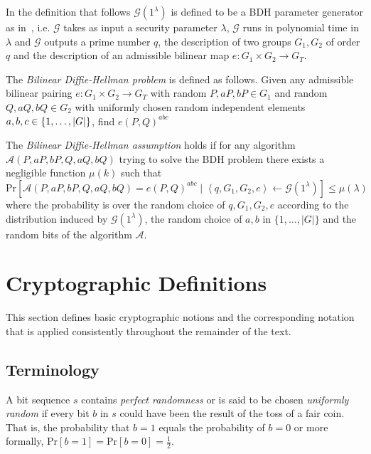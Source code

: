 In the definition that follows $\mathcal{G} \left( 1^{\lambda} \right)$ is defined to be a BDH parameter generator as in~\cite{art:BonehF01}, i.e. $\mathcal{G}$ takes as input a security parameter $\lambda$, $\mathcal{G}$ runs in polynomial time in $\lambda$ and $\mathcal{G}$ outputs a prime number $q$, the description of two groups $G_1, G_2$ of order $q$ and the description of an admissible bilinear map $e: G_1 \times G_2 \rightarrow G_T$.
\begin{defn}[BDH]
\label{def:bdh}
The \textit{Bilinear Diffie-Hellman problem} is defined as follows. Given any admissible bilinear pairing $e: G_1 \times G_2 \rightarrow G_T$ with random $P, aP, bP \in G_1$ and random $Q, aQ, bQ \in G_2$ with uniformly chosen random independent elements $a, b, c \medskip \in \{ 1, \ldots, | G |\}$, find $e \left( P, Q \right)^{abc}$

The \textit{Bilinear Diffie-Hellman assumption} holds if for any algorithm \\ $\mathcal{A} \left( P, aP, bP, Q, aQ, bQ \right)$ trying to solve the BDH problem there exists a negligible function $\mu \left( k \right)$ such that 
 \begin{equation*}
  \textrm{Pr} \left[ \mathcal{A} \left( P, aP, bP, Q, aQ, bQ \right) = e \left( P, Q \right)^{abc} \mid \left< q, G_1, G_2, e \right> \leftarrow \mathcal{G} \left( 1^{\lambda} \right)\right] \leq \mu \left( \lambda \right)
 \end{equation*}
 where the probability is over the random choice of $q, G_1, G_2, e$ according to the distribution induced by $\mathcal{G} \left( 1^{\lambda} \right)$, the random choice of $a, b$ in $\{ 1, \ldots, | G |\}$ and the random bits of the algorithm $\mathcal{A}$.
\end{defn}
\section{Cryptographic Definitions}
This section defines basic cryptographic notions and the corresponding notation that is applied consistently throughout the remainder of the text.

\subsection{Terminology}
\begin{defn}
\label{def:perfect_randomness}
 A bit sequence $s$ contains \textit{perfect randomness} or is said to be chosen \textit{uniformly random} if every bit $b$ in $s$ could have been the result of the toss of a fair coin. That is, the probability that $b = 1$ equals the probability of $b = 0$ or more formally, $\textrm{Pr} \left[ b = 1 \right] = \textrm{Pr} \left[ b = 0 \right] = \frac{1}{2}$.
\end{defn}

